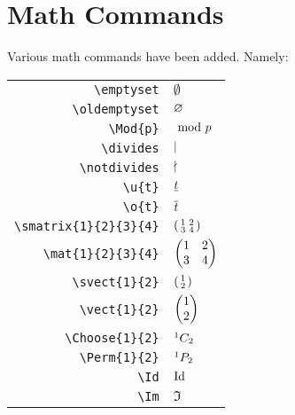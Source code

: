 \documentclass[12pt]{article}
\begin{document}
\section{Math Commands}

Various math commands have been added. Namely:
\begin{center}
    \begin{tabular}{r l}
        \verb|\emptyset| & $\emptyset$ \\
        \verb|\oldemptyset| & $\oldemptyset$ \\
        \verb|\Mod{p}| & $\ \mathrm{mod}\ p$ \\
        \verb|\divides| & $\vert$ \\
        \verb|\notdivides| & $\nmid$ \\
        \verb|\u{t}| & $\underline{t}$ \\
        \verb|\o{t}| & $\overline{t}$ \\
        \verb|\smatrix{1}{2}{3}{4}| & $\left(\begin{smallmatrix}1&2 \\ 3&4\end{smallmatrix}\right)$ \\
        \verb|\mat{1}{2}{3}{4}| & $\begin{pmatrix}1&2\\3&4\end{pmatrix}$ \\
        \verb|\svect{1}{2}| & $\left(\begin{smallmatrix}1\\2\end{smallmatrix}\right)$ \\
        \verb|\vect{1}{2}| & $\begin{pmatrix}1\\2\end{pmatrix}$ \\
        \verb|\Choose{1}{2}| & ${}^{1}C_{2}$ \\
        \verb|\Perm{1}{2}| & ${}^{1}P_{2}$ \\
        \verb|\Id| & $\text{Id}$ \\
        \verb|\Im| & $\Im$
    \end{tabular}
\end{center}
\end{document}
